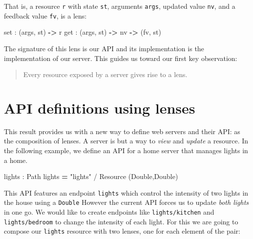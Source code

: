 \documentclass[sigplan,screen,review, nonacm]{acmart}
\newenvironment{Shaded}{}{}
\newcommand{\DataTypeTok}[1]{\textcolor[rgb]{0.56,0.13,0.00}{#1}}
\newcommand{\FunctionTok}[1]{\textcolor[rgb]{0.02,0.16,0.49}{#1}}
\newcommand{\KeywordTok}[1]{\textcolor[rgb]{0.00,0.44,0.13}{\textbf{#1}}}
\newcommand{\NormalTok}[1]{#1}
\newcommand{\OperatorTok}[1]{\textcolor[rgb]{0.40,0.40,0.40}{#1}}
\newcommand{\OtherTok}[1]{\textcolor[rgb]{0.00,0.44,0.13}{#1}}
\newcommand{\StringTok}[1]{\textcolor[rgb]{0.25,0.44,0.63}{#1}}
\begin{document}
That is, a resource \texttt{r} with state \texttt{st}, arguments
\texttt{args}, updated value \texttt{nv}, and a feedback value
\texttt{fv}, is a lens:

\begin{Shaded}
\begin{Highlighting}[]
\FunctionTok{set }\OperatorTok{:}\NormalTok{ (args, st) }\KeywordTok{{-}\textgreater{}}\NormalTok{ r}
\FunctionTok{get }\OperatorTok{:}\NormalTok{ (args, st) }\KeywordTok{{-}\textgreater{}}\NormalTok{ nv }\KeywordTok{{-}\textgreater{}}\NormalTok{ (fv, st)}
\end{Highlighting}
\end{Shaded}

The signature of this lens is our API and its implementation is the
implementation of our server. This guides us toward our first key
observation:

\begin{quote}
Every resource exposed by a server gives rise to a lens.
\end{quote}

\hypertarget{api-definitions-using-lenses}{%
\section{API definitions using
lenses}\label{api-definitions-using-lenses}}

This result provides us with a new way to define web servers
and their API: as the composition of lenses. A server is but a way to
\emph{view} and \emph{update} a resource. In the following
example, we define an API for a home server that manages lights in a
home.

\begin{Shaded}
\begin{Highlighting}[]
\FunctionTok{lights }\OperatorTok{:} \DataTypeTok{Path}
\FunctionTok{lights }\KeywordTok{=} \StringTok{"lights"} \OperatorTok{/} \OtherTok{Resource}\NormalTok{ (}\DataTypeTok{Double}\NormalTok{,}\DataTypeTok{Double}\NormalTok{)}
\end{Highlighting}
\end{Shaded}

This API features an endpoint \texttt{lights} which control the
intensity of two lights in the house using a \texttt{\DataTypeTok{Double}}
However the current API forces us to update \emph{both lights} in one go. We would
like to create endpoints like \texttt{lights/kitchen} and \texttt{lights/bedroom} to change the
intensity of each light. For this we are going to compose our
\texttt{lights} resource with two lenses, one for each element of the
pair:
\end{document}
